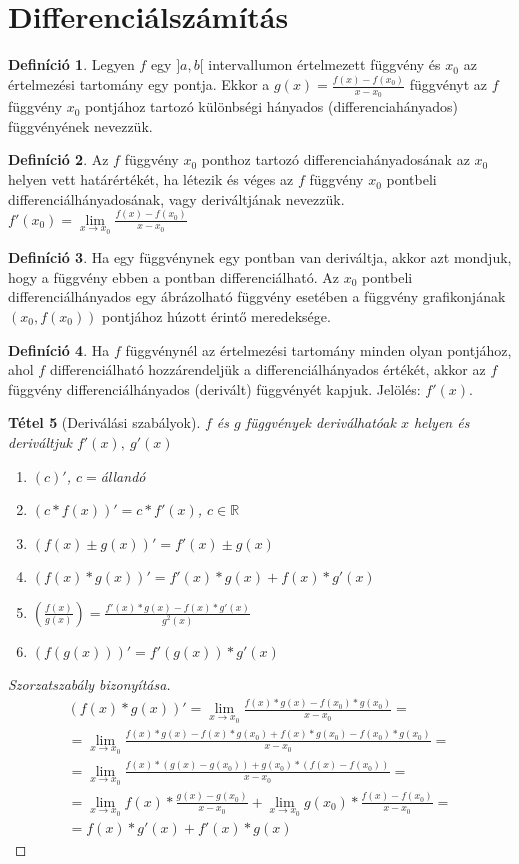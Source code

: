 \documentclass[twoside,12pt]{report}
\newtheorem{theorem}{Tétel}[section]
\theoremstyle{definition}
\newtheorem{definition}[theorem]{Definíció}
\begin{document}
\section{Differenciálszámítás}
	\begin{definition}
		Legyen $f$ egy $]a,b[$ intervallumon értelmezett függvény és $x_0$ az értelmezési tartomány egy pontja. Ekkor a $g(x)=\frac{f(x)-f(x_0)}{x-x_0}$ függvényt az $f$ függvény $x_0$ pontjához tartozó különbségi hányados (differenciahányados) függvényének nevezzük.
	\end{definition}
	\begin{definition}
		Az $f$ függvény $x_0$ ponthoz tartozó differenciahányadosának az $x_0$ helyen vett határértékét, ha létezik és véges az $f$ függvény $x_0$ pontbeli differenciálhányadosának, vagy deriváltjának nevezzük. $f'(x_0)=\lim\limits_{x\to x_0}\frac{f(x)-f(x_0)}{x-x_0}$
	\end{definition}
	\begin{definition}
		Ha egy függvénynek egy pontban van deriváltja, akkor azt mondjuk, hogy a függvény
		ebben a pontban differenciálható. Az $x_0$ pontbeli differenciálhányados egy ábrázolható függvény esetében a függvény grafikonjának $(x_0, f(x_0))$ pontjához húzott érintő meredeksége.
	\end{definition}
	\begin{definition}
		Ha $f$ függvénynél az értelmezési tartomány minden olyan pontjához, ahol $f$ differenciálható hozzárendeljük a differenciálhányados értékét, akkor az $f$ függvény differenciálhányados (derivált) függvényét kapjuk. Jelölés: $f'(x)$.
	\end{definition}
	\begin{theorem}[Deriválási szabályok]
		$f$ és $g$ függvények deriválhatóak $x$ helyen és deriváltjuk $f'(x),\ g'(x)$
		\begin{enumerate}
			\item $(c)'$, $c=$állandó
			\item $(c*f(x))'=c*f'(x)$, $c\in\mathbb{R}$
			\item $(f(x)\pm g(x))'=f'(x)\pm g(x)$
			\item $(f(x)*g(x))'=f'(x)*g(x)+f(x)*g'(x)$
			\item $\left(\frac{f(x)}{g(x)}\right)=\frac{f'(x)*g(x)-f(x)*g'(x)}{g^2(x)}$
			\item $(f(g(x)))'=f'(g(x))*g'(x)$
		\end{enumerate}
	\end{theorem}
	\begin{proof}[Szorzatszabály bizonyítása]
		\begin{align*}
		(f(x)*g(x))'=\lim\limits_{x\to x_0}\frac{f(x)*g(x)-f(x_0)*g(x_0)}{x-x_0}=\\
		=\lim\limits_{x\to x_0}\frac{f(x)*g(x)-f(x)*g(x_0)+f(x)*g(x_0)-f(x_0)*g(x_0)}{x-x_0}=\\
		=\lim\limits_{x\to x_0}\frac{f(x)*(g(x)-g(x_0))+g(x_0)*(f(x)-f(x_0))}{x-x_0}=\\
		=\lim\limits_{x\to x_0} f(x)*\frac{g(x)-g(x_0)}{x-x_0}+\lim\limits_{x\to x_0} g(x_0)*\frac{f(x)-f(x_0)}{x-x_0}=\\
		=f(x)*g'(x)+f'(x)*g(x)
		\end{align*}
	\end{proof}
\end{document}
